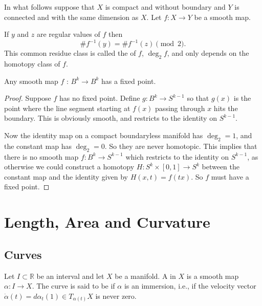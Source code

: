 \documentclass[10pt]{article}
\begin{document}
In what follows suppose that $X$ is compact and without boundary and $Y$ is connected and with the same dimension as $X$. Let $f: X \rightarrow Y$ be a smooth map.

\begin{theorem}
    If $y$ and $z$ are regular values of $f$ then
    $$
    \# f^{-1}(y)=\# f^{-1}(z) \pmod 2.
    $$
    This common residue class is called the  of $f$, $ \deg_2 f$, and only depends on the homotopy class of $f$.
\end{theorem}

\begin{corollary}
    Any smooth map $f$ : $B^{k} \rightarrow B^{k}$ has a fixed point.
\end{corollary}
\begin{proof}
    Suppose $f$ has no fixed point. Define $g: B^k \rightarrow S^{k - 1}$ so that $g(x)$ is the point where the line segment starting at $f(x)$ passing through $x$ hits the boundary. This is obviously smooth, and restricts to the identity on $S^{k - 1}$.

    Now the identity map on a compact boundaryless manifold has $\deg_2 = 1$, and the constant map has $\deg_2 = 0$. So they are never homotopic. This implies that there is no smooth map $f: B^{k} \rightarrow S^{k - 1}$ which restricts to the identity on $S^{k - 1}$, as otherwise we could construct a homotopy $H: S^k \times [0, 1] \rightarrow S^k$ between the constant map and the identity given by $H(x, t) = f(t x)$. So $f$ must have a fixed point. 
\end{proof}



\section{Length, Area and Curvature}

\subsection{Curves}

\begin{definition}[Curve]
    Let $I \subset \mathbb{R}$ be an interval and let $X$ be a manifold. A  in $X$ is a smooth map $\alpha: I \rightarrow X$. The curve is said to be  if $\alpha$ is an immersion, i.e., if the velocity vector $\dot{\alpha}(t) =d \alpha_t(1) \in T_{\alpha(t)} X$ is never zero.
\end{definition}
\end{document}
